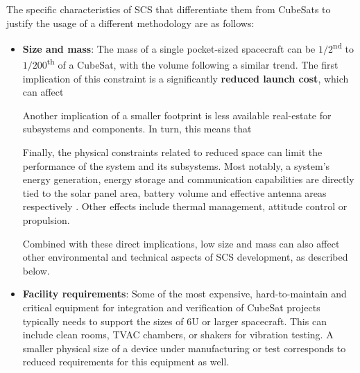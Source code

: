 \documentclass[a4paper,nobib,justified,final]{tufte-book}
\begin{document}
\label{sec:INTRODUCTION_what_makes_different}%
The specific characteristics of \acs{SCS} that differentiate them from CubeSats to justify the usage of a different methodology are as follows:
\begin{itemize}
	\item \textbf{Size and mass}: The mass of a single pocket-sized spacecraft can be \( 1 /2 \)\textsuperscript{nd} to \( 1/200 \)\textsuperscript{th} of a CubeSat, with the volume following a similar trend. The first implication of this constraint is a significantly \textbf{reduced launch cost}, which can affect 

	Another implication of a smaller footprint is less available real-estate for subsystems and components. In turn, this means that 

	Finally, the physical constraints related to reduced space can limit the performance of the system and its subsystems. Most notably, a system's energy generation, energy storage and communication capabilities are directly tied to the solar panel area, battery volume and effective antenna areas respectively \autocite{uludagAttoFemtoScale2026}. Other effects include thermal management, attitude control or propulsion.

	Combined with these direct implications, low size and mass can also affect other environmental and technical aspects of \acs{SCS} development, as described below.
	\item \textbf{Facility requirements}: Some of the most expensive, hard-to-maintain and critical equipment for integration and verification of CubeSat projects typically needs to support the sizes of 6U or larger spacecraft. This can include clean rooms, \ac{TVAC} chambers, or shakers for vibration testing. A smaller physical size of a device under manufacturing or test corresponds to reduced requirements for this equipment as well.
	

\end{itemize}
\end{document}
